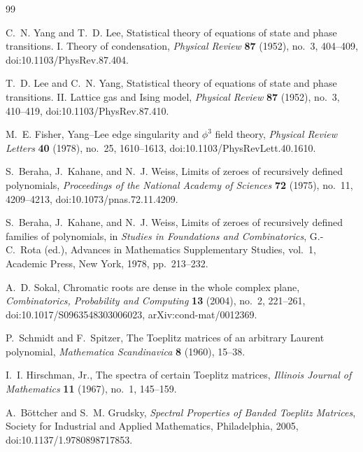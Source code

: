 \begin{thebibliography}{99}

C.~N. Yang and T.~D. Lee,
\newblock Statistical theory of equations of state and phase transitions. {I}. Theory of condensation,
\newblock \emph{Physical Review} \textbf{87} (1952), no.~3, 404--409,
\newblock doi:10.1103/PhysRev.87.404.

T.~D. Lee and C.~N. Yang,
\newblock Statistical theory of equations of state and phase transitions. {II}. Lattice gas and {I}sing model,
\newblock \emph{Physical Review} \textbf{87} (1952), no.~3, 410--419,
\newblock doi:10.1103/PhysRev.87.410.

M.~E. Fisher,
\newblock Yang--Lee edge singularity and \(\phi^3\) field theory,
\newblock \emph{Physical Review Letters} \textbf{40} (1978), no.~25, 1610--1613,
\newblock doi:10.1103/PhysRevLett.40.1610.

S.~Beraha, J.~Kahane, and N.~J. Weiss,
\newblock Limits of zeroes of recursively defined polynomials,
\newblock \emph{Proceedings of the National Academy of Sciences} \textbf{72} (1975), no.~11, 4209--4213,
\newblock doi:10.1073/pnas.72.11.4209.

S.~Beraha, J.~Kahane, and N.~J. Weiss,
\newblock Limits of zeroes of recursively defined families of polynomials,
\newblock in \emph{Studies in Foundations and Combinatorics}, G.-C.~Rota (ed.), Advances in Mathematics Supplementary Studies, vol.~1, Academic Press, New York, 1978, pp.~213--232.

A.~D. Sokal,
\newblock Chromatic roots are dense in the whole complex plane,
\newblock \emph{Combinatorics, Probability and Computing} \textbf{13} (2004), no.~2, 221--261,
\newblock doi:10.1017/S0963548303006023, arXiv:cond-mat/0012369.

P.~Schmidt and F.~Spitzer,
\newblock The Toeplitz matrices of an arbitrary Laurent polynomial,
\newblock \emph{Mathematica Scandinavica} \textbf{8} (1960), 15--38.

I.~I. Hirschman, Jr.,
\newblock The spectra of certain Toeplitz matrices,
\newblock \emph{Illinois Journal of Mathematics} \textbf{11} (1967), no.~1, 145--159.

A.~B\"ottcher and S.~M. Grudsky,
\newblock \emph{Spectral Properties of Banded Toeplitz Matrices},
\newblock Society for Industrial and Applied Mathematics, Philadelphia, 2005,
\newblock doi:10.1137/1.9780898717853.


\end{thebibliography}

